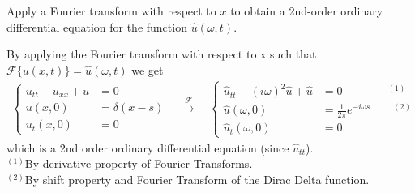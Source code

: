 \documentclass[12pt]{article}
\newcommand{\F}{\mathcal{F}}
\newenvironment{subproblem}[2][Part]{\begin{trivlist}
  \item[\hskip \labelsep {\bfseries #1}\hskip \labelsep {\bfseries (#2)}]}{\end{trivlist}}
\newenvironment{solution}[1][Solution]{\begin{trivlist}
  \item[\hskip \labelsep {\bfseries #1} \hskip \labelsep]}{\end{trivlist}}
\theoremstyle{remark}
\begin{document}
\begin{subproblem}{a}
  Apply a Fourier transform with respect to \(x\) to obtain a 2nd-order ordinary differential
  equation for the function \(\hat{u}(\omega,t)\).
\end{subproblem}
\begin{solution}
  $ $\\
  By applying the Fourier transform with respect to x such that \(\F\{u(x,t)\} =
  \hat{u}(\omega,t)\) we get
  \begin{align*}
    \left\{
    \begin{array}{ll}
      u_{tt}-u_{xx} + u &= 0 \\
      u(x,0) &= \delta(x-s) \\
      u_t(x,0) &= 0
    \end{array}
    \right.
    \quad\xrightarrow{\F}\quad
    \left\{
    \begin{array}{ll}
      \hat{u}_{tt} - (i\omega)^2\hat{u} + \hat{u} &= 0 \qquad\qquad^{(1)}\\
      \hat{u}(\omega,0) &= \frac{1}{2\pi}e^{-i\omega s} \qquad^{(2)}\\
      \hat{u}_t(\omega,0) &= 0.
    \end{array}
    \right.
  \end{align*}
  which is a 2nd order ordinary differential equation (since \(\hat{u}_{tt}\)). \\
  $ $\\
  \(^{(1)}\)By derivative property of Fourier Transforms. \\
  \(^{(2)}\)By shift property and Fourier Transform of the Dirac Delta function.
  \begin{subproblem}{b}
  \end{subproblem}
\end{solution}
\end{document}
